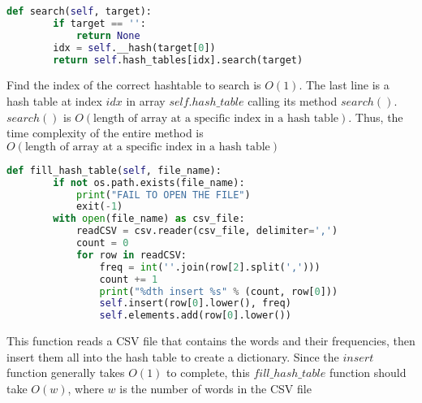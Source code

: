 \documentclass[10pt]{article}
\theoremstyle{definition}
\begin{document}
\begin{lstlisting}[language=Python, basicstyle=\small]
    def search(self, target):
        if target == '':
            return None
        idx = self.__hash(target[0])
        return self.hash_tables[idx].search(target)
\end{lstlisting}

Find the index of the correct hashtable to search is $O(1)$. The last line is a hash table at index $idx$ in array $self.hash\_table$ calling its method $search()$. $search()$ is $O(\text{length of array at a specific index in a hash table})$. Thus, the time complexity of the entire method is $O(\text{length of array at a specific index in a hash table})$

\begin{lstlisting}[language=Python, basicstyle=\small]
    def fill_hash_table(self, file_name):
        if not os.path.exists(file_name):
            print("FAIL TO OPEN THE FILE")
            exit(-1)
        with open(file_name) as csv_file:
            readCSV = csv.reader(csv_file, delimiter=',')
            count = 0
            for row in readCSV:
                freq = int(''.join(row[2].split(',')))
                count += 1
                print("%dth insert %s" % (count, row[0]))
                self.insert(row[0].lower(), freq)
                self.elements.add(row[0].lower())
\end{lstlisting}

This function reads a CSV file that contains the words and their frequencies, then insert them all into the hash table to create a dictionary. Since the $insert$ function generally takes $O(1)$ to complete, this $fill\_hash\_table$ function should take $O(w)$, where $w$ is the number of words in the CSV file
\end{document}
